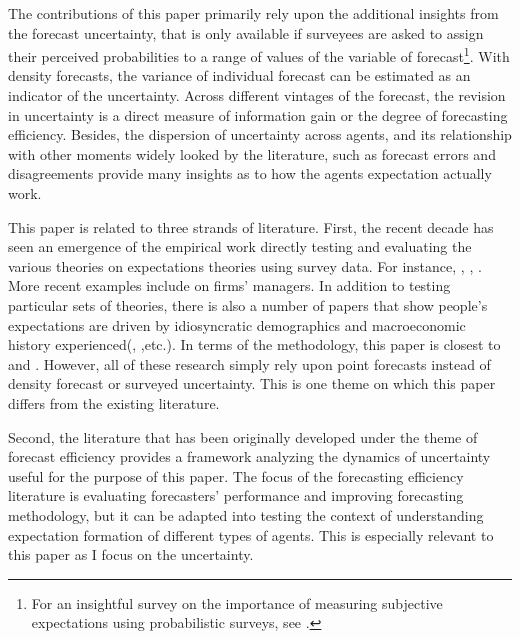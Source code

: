 \documentclass[]{article}
\begin{document}
	The contributions of this paper primarily rely upon the additional insights from the forecast uncertainty, that is only available if surveyees are asked to assign their perceived probabilities to a range of values of the variable of forecast\footnote{For an insightful survey on the importance of measuring subjective expectations using probabilistic surveys, see \citet{manski2004measuring}.}. With density forecasts,  the variance of individual forecast can be estimated as an indicator of the uncertainty. Across different vintages of the forecast, the revision in uncertainty is a direct measure of  information gain or the degree of forecasting efficiency. Besides, the dispersion of uncertainty across agents, and its relationship with other moments widely looked by the literature, such as forecast errors and disagreements provide many insights as to how the agents expectation actually work.  
	
	This paper is related to three strands of literature. First, the recent decade has seen an emergence of the empirical work directly testing and evaluating the various theories on expectations theories using survey data. For instance, \citet{mankiw2003disagreement}, \citet{carroll2003macroeconomic}, \citet{branch2004theory}. More recent examples include \citet{coibion2018firms} on firms' managers. In addition to testing particular sets of theories, there is also a number of papers that show people's expectations are driven by idiosyncratic demographics and macroeconomic history experienced(\citet{malmendier2015learning}, \citet{das2017socioeconomic},etc.). In terms of the methodology, this paper is closest to \citet{coibion2012can} and \citet{fuhrer2018intrinsic}.  However, all of these research simply rely upon point forecasts instead of density forecast or surveyed uncertainty. This is one theme on which this paper differs from the existing literature.   
	
	Second, the literature that has been originally developed under the theme of forecast efficiency provides a framework analyzing the dynamics of uncertainty useful for the purpose of this paper. The focus of the forecasting efficiency literature is evaluating forecasters' performance and improving forecasting methodology, but it can be adapted into testing the context of understanding expectation formation of different types of agents. This is especially relevant to this paper as I focus on the uncertainty. 
	
\end{document}
